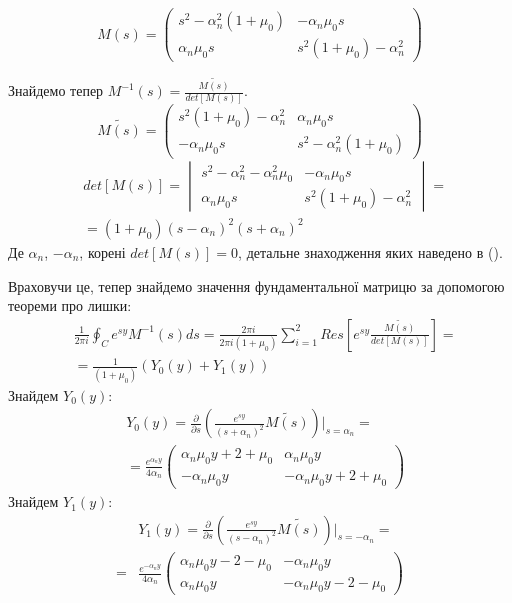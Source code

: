\begin{equation}
    M(s) = \begin{pmatrix}
        s^2 -\alpha_n^2(1 + \mu_0) & -\alpha_n \mu_0 s \\
        \alpha_n \mu_0 s & s^2 (1 + \mu_0) -\alpha_n^2
     \end{pmatrix}
\end{equation}

Знайдемо тепер $M^{-1}(s) = \frac{\widetilde{M(s)}}{det[M(s)]}$.
\begin{equation}
    \widetilde{M(s)} = \begin{pmatrix}
        s^2 (1 + \mu_0) -\alpha_n^2 & \alpha_n \mu_0 s \\
        -\alpha_n \mu_0 s & s^2 -\alpha_n^2(1 + \mu_0)
     \end{pmatrix}
\end{equation}
\begin{align}
    &det[M(s)] = \begin{vmatrix}
        s^2 - \alpha_n^2 - \alpha_n^2\mu_0 & -\alpha_n \mu_0 s \\
        \alpha_n \mu_0 s & s^2 (1 + \mu_0) -\alpha_n^2
     \end{vmatrix} = \nonumber \\
    &=(1+\mu_0)(s - \alpha_n)^2(s + \alpha_n)^2
\end{align}
Де $\alpha_n$, $-\alpha_n$, корені $det[M(s)]=0$, детальне знаходження яких наведено в ().

Враховучи це, тепер знайдемо значення фундаментальної матрицю за допомогою теореми про лишки:
\begin{align*}
    &\frac{1}{2\pi i} \oint_C e^{sy} M^{-1}(s)ds = \frac{2 \pi i}{2 \pi i (1 + \mu_0)} \sum_{i=1}^{2} Res\left[ e^{sy} \frac{\widetilde{M(s)}}{det[M(s)]} \right] = \\
    & = \frac{1}{(1 + \mu_0)} \left(Y_0(y) + Y_1(y) \right)
\end{align*}
Знайдем $Y_0(y)$:
\begin{align}
    &Y_0(y) =  \frac{\partial}{\partial s} \left( \frac{e^{sy}}{(s+\alpha_n)^2} \widetilde{M(s)} \right) \Big|_{s=\alpha_n} = \nonumber \\
    &=\frac{e^{\alpha_n y}}{4\alpha_n} \begin{pmatrix}
    \alpha_n \mu_0 y + 2 + \mu_0 & \alpha_n \mu_0 y \\
    -\alpha_n \mu_0 y & -\alpha_n \mu_0 y + 2 + \mu_0
    \end{pmatrix}
\end{align}
Знайдем $Y_1(y)$:
\begin{align}
    &Y_1(y) = \frac{\partial}{\partial s} \left(\frac{e^{sy}}{(s-\alpha_n)^2} \widetilde{M(s)} \right) \Big|_{s=-\alpha_n} = \nonumber \\
    =&\frac{e^{-\alpha_n y}}{4\alpha_n} \begin{pmatrix}
    \alpha_n \mu_0 y - 2 - \mu_0 & -\alpha_n \mu_0 y \\
    \alpha_n \mu_0 y & -\alpha_n \mu_0 y - 2 - \mu_0
    \end{pmatrix}
\end{align}

